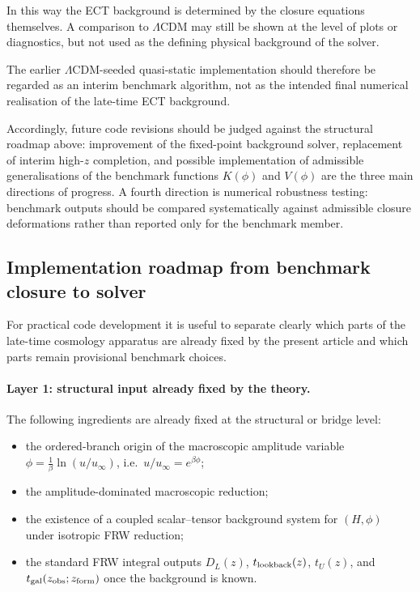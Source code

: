 \documentclass[11pt,a4paper]{article}
\numberwithin{equation}{section}
\begin{document}
In this way the ECT background is determined by the closure equations
themselves.
A comparison to $\Lambda$CDM may still be shown at the level of plots or
diagnostics, but not used as the defining physical background of the
solver.

The earlier $\Lambda$CDM-seeded quasi-static implementation should
therefore be regarded as an interim benchmark algorithm, not as the
intended final numerical realisation of the late-time ECT background.

Accordingly, future code revisions should be judged against the
structural roadmap above: improvement of the fixed-point background
solver, replacement of interim high-$z$ completion, and possible
implementation of admissible generalisations of the benchmark functions
$K(\phi)$ and $V(\phi)$ are the three main directions of progress.
A fourth direction is numerical robustness testing:
benchmark outputs should be compared systematically against admissible
closure deformations rather than reported only for the benchmark member.

\subsection{Implementation roadmap from benchmark closure to solver}
\label{sec:late_cosmo_roadmap}

For practical code development it is useful to separate clearly which
parts of the late-time cosmology apparatus are already fixed by the
present article and which parts remain provisional benchmark choices.

\paragraph{Layer 1: structural input already fixed by the theory.}
The following ingredients are already fixed at the structural or
bridge level:
\begin{itemize}
  \item the ordered-branch origin of the macroscopic amplitude variable
  $\phi=\frac{1}{\beta}\ln(u/u_\infty)$, i.e.\ $u/u_\infty=e^{\beta\phi}$;
  \item the amplitude-dominated macroscopic reduction;
  \item the existence of a coupled scalar--tensor background system for
  $(H,\phi)$ under isotropic FRW reduction;
  \item the standard FRW integral outputs
  $D_L(z)$, $t_{\rm lookback}(z)$, $t_U(z)$, and
  $t_{\rm gal}(z_{\rm obs};z_{\rm form})$ once the background is known.
\end{itemize}
\end{document}
